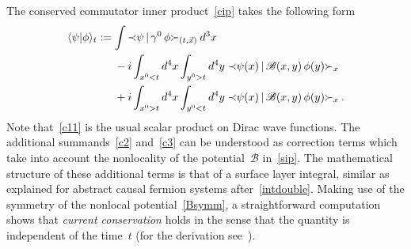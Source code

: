 \documentclass[reqno,11pt]{amsart}
\numberwithin{equation}{section}
\newcommand{\la}{\langle}
\newcommand{\ra}{\rangle}
\newcommand{\Sl}{\mbox{$\prec \!\!$ \nolinebreak}}
\newcommand{\Sr}{\mbox{\nolinebreak $\succ$}}
\newcommand{\1}{\mathds{1}}
\newcommand{\B}{{\mathscr{B}}}
\begin{document}
The conserved commutator inner product~\eqref{cip} takes the following form
\begin{align}
\la \psi | \phi \ra_t &:= \int \Sl \psi \,|\, \gamma^0\, \phi \Sr_{(t,\vec{x})} \: d^3x \label{c11} \\
&\quad\;\; -i \int_{x^0<t} d^4x \int_{y^0>t} d^4y\;
\Sl \psi(x) \,|\, \B(x,y)\, \phi(y) \Sr_x \label{c2} \\
&\quad\;\; +i \int_{x^0>t} d^4x \int_{y^0<t} d^4y\;
\Sl \psi(x) \,|\, \B(x,y)\, \phi(y) \Sr_x \:. \label{c3}
\end{align}
Note that~\eqref{c11} is the usual scalar product on Dirac wave functions.
The additional summands~\eqref{c2} and~\eqref{c3} can be understood as correction terms
which take into account the nonlocality of the potential~$\B$ in~\eqref{sip}.
The mathematical structure of these additional terms is that of a surface layer integral,
similar as explained for abstract causal fermion systems after~\eqref{intdouble}.
Making use of the symmetry of the nonlocal potential~\eqref{Bsymm}, a straightforward computation
shows that {\em{current conservation}} holds in the sense that the quantity
is independent of the time~$t$ (for the derivation see~\cite[Proposition~B.1]{baryogenesis}).
\end{document}
